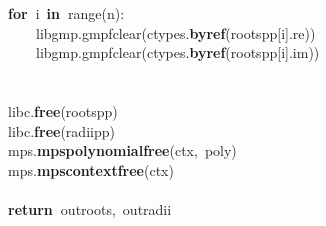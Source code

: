 \documentclass{article}\usepackage[]{graphicx}\usepackage[dvipsnames,table]{xcolor}
\makeatletter
\newcommand{\hlnum}[1]{\textcolor[rgb]{0.686,0.059,0.569}{#1}}%
\newcommand{\hlopt}[1]{\textcolor[rgb]{0,0,0}{#1}}%
\newcommand{\hldef}[1]{\textcolor[rgb]{0.345,0.345,0.345}{#1}}%
\newcommand{\hlkwa}[1]{\textcolor[rgb]{0.161,0.373,0.58}{\textbf{#1}}}%
\newcommand{\hlkwb}[1]{\textcolor[rgb]{0.69,0.353,0.396}{#1}}%
\newcommand{\hlkwd}[1]{\textcolor[rgb]{0.737,0.353,0.396}{\textbf{#1}}}%
\newenvironment{kframe}{%
 \def\at@end@of@kframe{}%
 \ifinner\ifhmode%
  \def\at@end@of@kframe{\end{minipage}}%
  \begin{minipage}{\columnwidth}%
 \fi\fi%
 \def\FrameCommand##1{\hskip\@totalleftmargin \hskip-\fboxsep
 \colorbox{shadecolor}{##1}\hskip-\fboxsep
     \hskip-\linewidth \hskip-\@totalleftmargin \hskip\columnwidth}%
 \MakeFramed {\advance\hsize-\width
   \@totalleftmargin\z@ \linewidth\hsize
   \@setminipage}}%
 {\par\unskip\endMakeFramed%
 \at@end@of@kframe}
\newenvironment{knitrout}{}{} %
\makeatother
\begin{document}
\begin{center}
\begin{minipage}[m]{18cm}
\begin{knitrout}
\begin{kframe}
\hldef{}\hldef{\ \ \ \ }\hldef{}\hlkwa{for\ }\hldef{i\ }\hlkwa{in\ }\hldef{}\hlkwb{range}\hldef{}\hlopt{(}\hldef{n}\hlopt{):}\hspace*{\fill}\\
\hldef{}\hldef{\ \ \ \ \ \ \ \ }\hldef{\textunderscore libgmp}\hlnum{.\textunderscore \textunderscore }\hldef{gmpf}\hlnum{\textunderscore }\hldef{clear}\hlopt{(}\hldef{ctypes}\hlopt{.}\hldef{}\hlkwd{byref}\hldef{}\hlopt{(}\hldef{roots\textunderscore pp}\hlopt{{[}}\hldef{i}\hlopt{{]}.}\hldef{re}\hlopt{))}\hspace*{\fill}\\
\hldef{}\hldef{\ \ \ \ \ \ \ \ }\hldef{\textunderscore libgmp}\hlnum{.\textunderscore \textunderscore }\hldef{gmpf}\hlnum{\textunderscore }\hldef{clear}\hlopt{(}\hldef{ctypes}\hlopt{.}\hldef{}\hlkwd{byref}\hldef{}\hlopt{(}\hldef{roots\textunderscore pp}\hlopt{{[}}\hldef{i}\hlopt{{]}.}\hldef{im}\hlopt{))}\hspace*{\fill}\\
\hldef{}\hspace*{\fill}\\
\hldef{}\hldef{\ \ \ \ }\hldef{}\hspace*{\fill}\\
\hldef{}\hldef{\ \ \ \ }\hldef{\textunderscore libc}\hlopt{.}\hldef{}\hlkwd{free}\hldef{}\hlopt{(}\hldef{roots\textunderscore pp}\hlopt{)}\hspace*{\fill}\\
\hldef{}\hldef{\ \ \ \ }\hldef{\textunderscore libc}\hlopt{.}\hldef{}\hlkwd{free}\hldef{}\hlopt{(}\hldef{radii\textunderscore pp}\hlopt{)}\hspace*{\fill}\\
\hldef{}\hldef{\ \ \ \ }\hldef{\textunderscore mps}\hlopt{.}\hldef{}\hlkwd{mps\textunderscore polynomial\textunderscore free}\hldef{}\hlopt{(}\hldef{ctx}\hlopt{,\ }\hldef{poly}\hlopt{)}\hspace*{\fill}\\
\hldef{}\hldef{\ \ \ \ }\hldef{\textunderscore mps}\hlopt{.}\hldef{}\hlkwd{mps\textunderscore context\textunderscore free}\hldef{}\hlopt{(}\hldef{ctx}\hlopt{)}\hspace*{\fill}\\
\hldef{}\hspace*{\fill}\\
\hldef{}\hldef{\ \ \ \ }\hldef{}\hlkwa{return\ }\hldef{out\textunderscore roots}\hlopt{,\ }\hldef{out\textunderscore radii}\hspace*{\fill}
\mbox{}
\normalfont
\end{kframe}
\end{knitrout}
\end{minipage}
\end{center}
\end{document}
